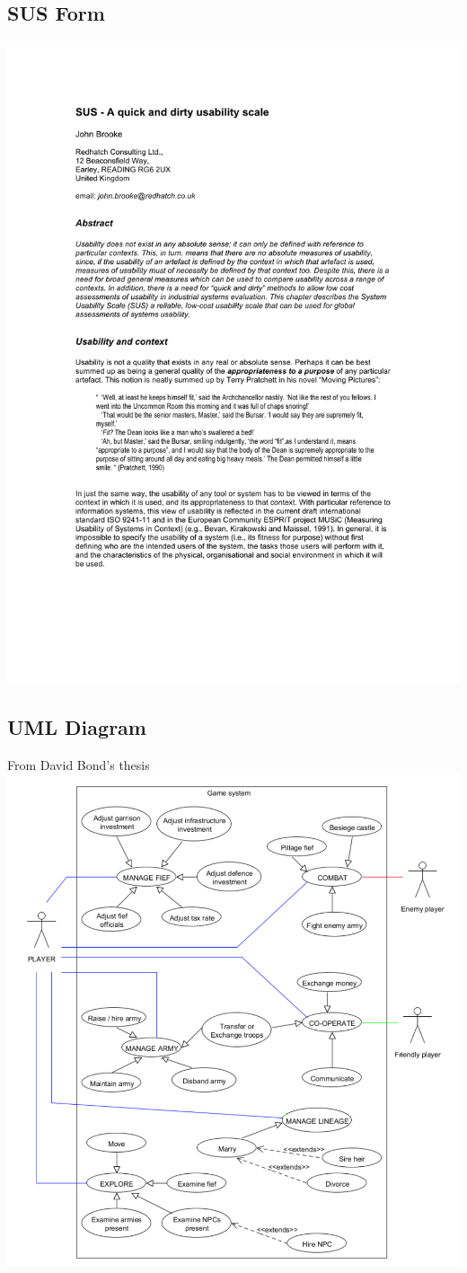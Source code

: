 \documentclass{article}
\begin{document}
	\subsection{SUS Form}
	\centering
	\includegraphics[page=6]{sus.pdf} 
	\subsection{UML Diagram}From David Bond's thesis\cite{DavidBond}
	\centering
	\includegraphics[width=\textwidth]{gameUML}
\end{document}
